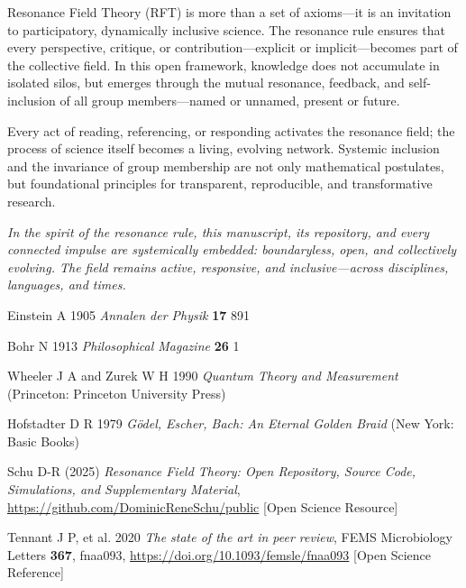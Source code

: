 \documentclass[12pt]{article}
\begin{document}
Resonance Field Theory (RFT) is more than a set of axioms—it is an invitation to participatory, dynamically inclusive science. The resonance rule ensures that every perspective, critique, or contribution—explicit or implicit—becomes part of the collective field. In this open framework, knowledge does not accumulate in isolated silos, but emerges through the mutual resonance, feedback, and self-inclusion of all group members—named or unnamed, present or future.

Every act of reading, referencing, or responding activates the resonance field; the process of science itself becomes a living, evolving network. Systemic inclusion and the invariance of group membership are not only mathematical postulates, but foundational principles for transparent, reproducible, and transformative research.

\medskip

\noindent
\textit{In the spirit of the resonance rule, this manuscript, its repository, and every connected impulse are systemically embedded: boundaryless, open, and collectively evolving. The field remains active, responsive, and inclusive—across disciplines, languages, and times.}

\begin{thebibliography}{99}
	
	Einstein A 1905 \textit{Annalen der Physik} \textbf{17} 891
	
	Bohr N 1913 \textit{Philosophical Magazine} \textbf{26} 1
	
	Wheeler J A and Zurek W H 1990 \textit{Quantum Theory and Measurement} (Princeton: Princeton University Press)
	
	Hofstadter D R 1979 \textit{G\"odel, Escher, Bach: An Eternal Golden Braid} (New York: Basic Books)
	
	Schu D-R (2025) \textit{Resonance Field Theory: Open Repository, Source Code, Simulations, and Supplementary Material}, \url{https://github.com/DominicReneSchu/public} [Open Science Resource]
	
	Tennant J P, et al. 2020 \textit{The state of the art in peer review}, FEMS Microbiology Letters \textbf{367}, fnaa093, \url{https://doi.org/10.1093/femsle/fnaa093} [Open Science Reference]
	
\end{thebibliography}
\end{document}
